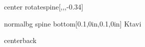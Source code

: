 \documentclass[
coverheight=9.93in,%
coverwidth=7.565in,%
spinewidth=.688in,
bleedwidth=.75in,
marklength=0in,
12pt,
pagecolor=background,
]{bookcover}
\newcommand{\hebtitle}{
}
\newcommand{\engtitle}{
}
\newcommand{\hebtext}[1]{
	\begin{hebrew}
		#1
	\end{hebrew}
}
\begin{document}
	\begin{bookcover}
		\begin{bookcoverelement}{center rotate}{spine}[,,,-0.34\coverheight]
			\LARGE\textcolor{gold}{\hebtext{\hebtitle} \space \engtitle }
		\end{bookcoverelement}
		\begin{bookcoverelement}{normal}{bg spine bottom}[0.1\spinewidth,0in,0.1\spinewidth,0in]
			\textcolor{text}{Ktavi}
		\end{bookcoverelement}
		
		\begin{bookcoverelement}{center}{back}
			\begin{Huge}
				\textcolor{gold}{\hebtext{\hebtitle}}
				
				\textcolor{gold}{\engtitle}
				
			\end{Huge}
			\vspace{2\baselineskip}
			\begin{large}
			\end{large}
		\end{bookcoverelement}
	\end{bookcover}
\end{document}

